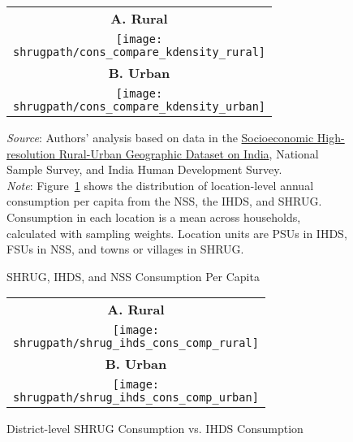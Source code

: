 \documentclass[12pt,letterpaper]{article}
\newcommand{\panel}{\fontfamily{phv}\selectfont\scriptsize\textbf}
\begin{document}
\begin{appendix}
\begin{table}[H]
  \label{tab:emp_conc}
\end{table}


\newpage
\begin{figure}[H]\caption{SHRUG, IHDS, and NSS Consumption Per Capita}
\begin{center}
  \begin{tabular}{c}
    \panel{A. Rural} \\
    \texttt{[image: \\shrugpath/cons\_compare\_kdensity\_rural]} \\
    \panel{B. Urban} \\
    \texttt{[image: \\shrugpath/cons\_compare\_kdensity\_urban]} 
  \end{tabular}
\end{center}

\begin{adjustwidth}{2cm}{2cm}
  \footnotesize{\textit{Source}: Authors' analysis based on data in the
    \href{http://www.devdatalab.org/shrug}{Socioeconomic
      High-resolution Rural-Urban Geographic Dataset on India},
    National Sample Survey, and India Human Development
    Survey. \\ \textit{Note}: Figure~\ref{fig:ihds_nss_shrug_cons_kdensity} shows the
    distribution of location-level annual consumption per capita from the
    NSS, the IHDS, and SHRUG. Consumption in each location is a mean
    across households, calculated with sampling weights. Location
    units are PSUs in IHDS, FSUs in NSS, and towns or villages in
    SHRUG.}
\end{adjustwidth}

\label{fig:ihds_nss_shrug_cons_kdensity}
\end{figure}

\newpage
\begin{figure}[H]\caption{District-level SHRUG Consumption vs. IHDS Consumption}
\begin{center}
  \begin{tabular}{c}
    \panel{A. Rural} \\
    \texttt{[image: \\shrugpath/shrug\_ihds\_cons\_comp\_rural]} \\
    \panel{B. Urban} \\
    \texttt{[image: \\shrugpath/shrug\_ihds\_cons\_comp\_urban]} \\
  \end{tabular}
\end{center}


\end{figure}
\end{appendix}
\end{document}
